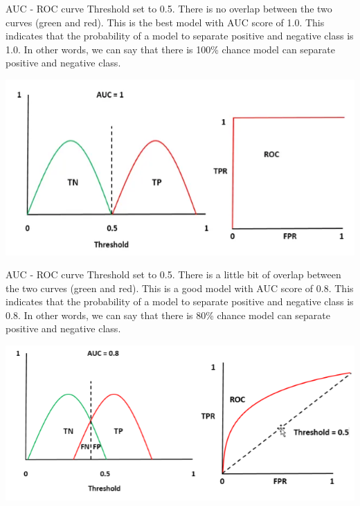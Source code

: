 \documentclass[11pt]{beamer}
\begin{document}
\begin{frame}{AUC - ROC curve}
	Threshold set to 0.5. There is no overlap between the two curves (green and red). This is the best model with AUC score of 1.0. This indicates that the probability of a model to separate positive and negative class is 1.0. In other words, we can say that there is 100\% chance model can separate positive and negative class.
	\begin{center}
	\includegraphics[scale=0.5]{../05-pictures/lesson-4-1_pic_4.png}
	\end{center}
\end{frame}
\begin{frame}{AUC - ROC curve}
	Threshold set to 0.5. There is a little bit of overlap between the two curves (green and red). This is a good model with AUC score of 0.8. This indicates that the probability of a model to separate positive and negative class is 0.8. In other words, we can say that there is 80\% chance model can separate positive and negative class.
	\begin{center}
	\includegraphics[scale=0.5]{../05-pictures/lesson-4-1_pic_5.png}
	\end{center}
\end{frame}
\end{document}
